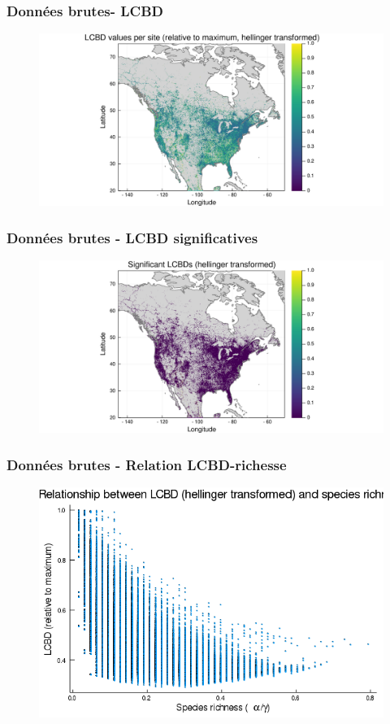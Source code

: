 \documentclass[10pt]{beamer}
\begin{document}
\begin{frame}
  \frametitle{Données brutes- LCBD}
  \begin{figure}
    \centering
    \includegraphics[scale=0.4]{fig/raw-lcbd-transf.pdf}
  \end{figure}
\end{frame}

\begin{frame}
  \frametitle{Données brutes - LCBD significatives}
  \begin{figure}
    \centering
    \includegraphics[scale=0.4]{fig/raw-lcbd-signif.pdf}
  \end{figure}
\end{frame}

\begin{frame}
  \frametitle{Données brutes - Relation LCBD-richesse}
  \begin{figure}
    \centering
    \includegraphics[scale=0.4]{fig/raw-relation-lcbd-richness-transf.png}
  \end{figure}
\end{frame}
\end{document}
